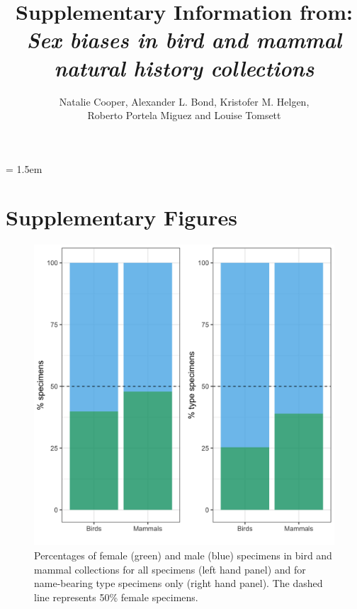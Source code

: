 \documentclass[a4paper, 12pt]{article}
\title{Supplementary Information from: \textit{Sex biases in bird and mammal natural history collections}}
\author{Natalie Cooper, 
  Alexander L. Bond,
  Kristofer M. Helgen,\\
  Roberto Portela Miguez and
  Louise Tomsett}
\date{}
\begin{document}
\maketitle

\parindent = 1.5em
\addtolength{\parskip}{.3em}


\section{Supplementary Figures} 

\begin{figure}
 \centering
  \includegraphics[width = \linewidth]{figures/types-all.png}
  \caption{Percentages of female (green) and male (blue) specimens in bird and mammal collections for all specimens (left hand panel) and for name-bearing type specimens only (right hand panel). 
  The dashed line represents 50\% female specimens.}
  \label{fig-types}
\end{figure}
\end{document}
